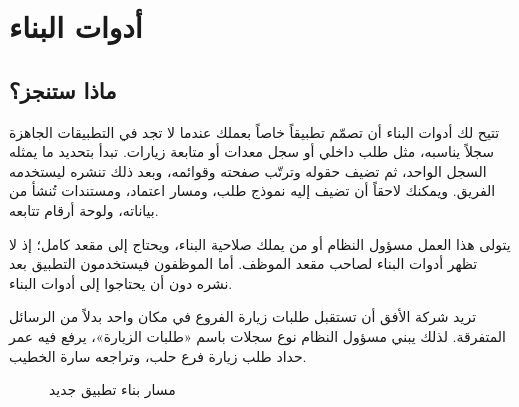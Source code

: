 \chapter{أدوات البناء}
\label{ch:builder}

\section{ماذا ستنجز؟}

تتيح لك أدوات البناء أن تصمّم تطبيقاً خاصاً بعملك عندما لا تجد في التطبيقات الجاهزة سجلاً يناسبه، مثل طلب داخلي أو سجل معدات أو متابعة زيارات. تبدأ بتحديد ما يمثله السجل الواحد، ثم تضيف حقوله وترتّب صفحته وقوائمه، وبعد ذلك تنشره ليستخدمه الفريق. ويمكنك لاحقاً أن تضيف إليه نموذج طلب، ومسار اعتماد، ومستندات تُنشأ من بياناته، ولوحة أرقام تتابعه.

يتولى هذا العمل مسؤول النظام أو من يملك صلاحية البناء، ويحتاج إلى مقعد كامل؛ إذ لا تظهر أدوات البناء لصاحب مقعد الموظف. أما الموظفون فيستخدمون التطبيق بعد نشره دون أن يحتاجوا إلى أدوات البناء.

\begin{rcnote}
تريد شركة الأفق أن تستقبل طلبات زيارة الفروع في مكان واحد بدلاً من الرسائل المتفرقة. لذلك يبني مسؤول النظام نوع سجلات باسم «طلبات الزيارة»، يرفع فيه عمر حداد طلب زيارة فرع حلب، وتراجعه سارة الخطيب.
\end{rcnote}

\begin{figure}[H]
\centering
{}
\rclegend
\caption{مسار بناء تطبيق جديد}
\label{fig:builder-overview-flow}
\end{figure}

